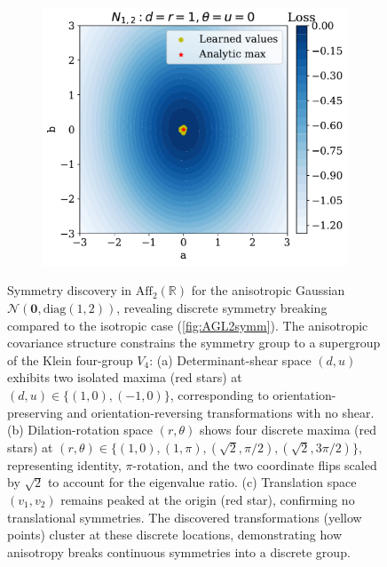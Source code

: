 \begin{figure}
\begin{subfigure}[b]{0.31\textwidth}
        \label{fig:AGL2asymm_ii}
    \end{subfigure}
    \hfill
    \begin{subfigure}[b]{0.31\textwidth}
        \centering
        \includegraphics[width=\textwidth]{figures/chapter-09/6GL2asymmAB.pdf}
        \caption{}
        \label{fig:AGL2asymm_iii}
    \end{subfigure}
    \caption[Discrete symmetry structure of anisotropic Gaussian in $\text{Aff}_2(\mathbb{R})$ discovered by \textsc{SymmetryGAN}.]{Symmetry discovery in $\text{Aff}_2(\mathbb{R})$ for the anisotropic Gaussian $\mathcal{N}(\mathbf{0}, \text{diag}(1,2))$, revealing discrete symmetry breaking compared to the isotropic case (\cref{fig:AGL2symm}). The anisotropic covariance structure constrains the symmetry group to a supergroup of the Klein four-group $V_4$: (a) Determinant-shear space $(d, u)$ exhibits two isolated maxima (red stars) at $(d, u) \in \{(1, 0), (-1, 0)\}$, corresponding to orientation-preserving and orientation-reversing transformations with no shear. (b) Dilation-rotation space $(r, \theta)$ shows four discrete maxima (red stars) at $(r, \theta) \in \{(1, 0), (1, \pi), (\sqrt{2}, \pi/2), (\sqrt{2}, 3\pi/2)\}$, representing identity, $\pi$-rotation, and the two coordinate flips scaled by $\sqrt{2}$ to account for the eigenvalue ratio. (c) Translation space $(v_1, v_2)$ remains peaked at the origin (red star), confirming no translational symmetries. The discovered transformations (yellow points) cluster at these discrete locations, demonstrating how anisotropy breaks continuous symmetries into a discrete group.}
    \label{fig:AGL2asymm}
\end{figure}
